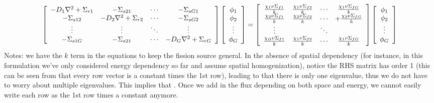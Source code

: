 \documentclass{school-22.211-notes}
\begin{document}
\begin{align}
\left[ \begin{array}{cccc} 
    - D_1 \nabla^2 +  \Sigma_{r1} & - \Sigma_{s21} & \cdots & - \Sigma_{sG1} \\
    - \Sigma_{s12} & -D_2 \nabla^2  +  \Sigma_{r2} & \cdots & - \Sigma_{sG2} \\
    \vdots & \vdots & \ddots & \vdots \\
    - \Sigma_{s1G} & - \Sigma_{s21} & \cdots &  - D_G \nabla^2 + \Sigma_{rG}  \end{array} \right] 
\left[ \begin{array}{c} \phi_1 \\ \phi_2 \\ \vdots \\ \phi_G \end{array} \right]
= \left[ \begin{array}{cccc} 
\frac{\chi_1 \nu \Sigma_{f1}}{k} & \frac{\chi_1 \nu \Sigma_{f2}}{k} & \cdots & \frac{\chi_1 \nu \Sigma_{fG}}{k} \\
\frac{\chi_2 \nu \Sigma_{f1}}{k} & \frac{\chi_2 \nu \Sigma_{f2}}{k} & \cdots &   + \frac{\chi_2 \nu \Sigma_{fG}}{k} \\
\vdots & & \ddots &  \\
\frac{\chi_G \nu \Sigma_{f1}}{k} & \frac{\chi_1 \nu \Sigma_{f2}}{k} & \cdots & \frac{\chi_1 \nu \Sigma_{fG}}{k} \\
\end{array} \right] 
\left[ \begin{array}{c} \phi_1 \\ \phi_2 \\ \vdots \\ \phi_G \end{array} \right]
\end{align}
Notes: we have the $k$ term in the equations to keep the fission source general. In the absence of spatial dependency (for instance, in this formulation we've only considered energy dependency so far and assume spatial homogenization), notice the RHS matrix has order 1 (this can be seen from that every row vector is a constant times the 1st row), leading to that there is only one eigenvalue, thus we do not have to worry about multiple eigenvalues. This implies that . Once we add in the flux depending on both space and energy, we cannot easily write each row as the 1st row times a constant anymore. 
\end{document}
